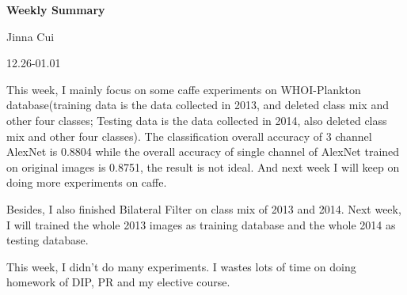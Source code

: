 \documentclass{article}
\begin{document}


\pagestyle{fancy}
\begin{center}
\textbf{\LARGE{Weekly Summary}} %
\end{center}

\begin{center}
Jinna Cui
\end{center}

\begin{center}
12.26-01.01
\end{center}

This week, I mainly focus on some caffe experiments on WHOI-Plankton database(training data is the data collected in 2013, and deleted class mix and other four classes; Testing data is the data collected in 2014, also deleted class mix and other four classes). The classification overall accuracy of 3 channel AlexNet is 0.8804 while the overall accuracy of single channel of AlexNet trained on original images is 0.8751, the result is not ideal. And next week I will keep on doing more experiments on caffe.

Besides, I also finished Bilateral Filter on class mix of 2013 and 2014. Next week, I will trained the whole 2013 images as training database and the whole 2014 as testing database. 

This week, I didn't do many experiments. I wastes lots of time on doing homework of DIP, PR and my elective course.
\end{document}
